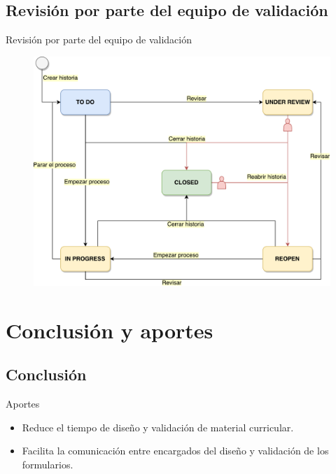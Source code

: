 \documentclass[10pt,xcolor=table ]{beamer}
\begin{document}
\subsection{Revisión por parte del equipo de validación}
\begin{frame}{Revisión por parte del equipo de validación}
	\begin{figure}
		\centering
	    \includegraphics[scale=0.35]{../Figuras/workflow}
	\end{figure}
\end{frame}


\section{Conclusión y aportes}
\subsection{Conclusión}
\begin{frame}{Aportes}
	\begin{itemize}[<+- | alert@+>]
	    \item Reduce el tiempo de diseño y validación de material curricular.
	    \item Facilita la comunicación entre encargados del diseño y validación de los formularios.
	\end{itemize}
\end{frame}
\end{document}

